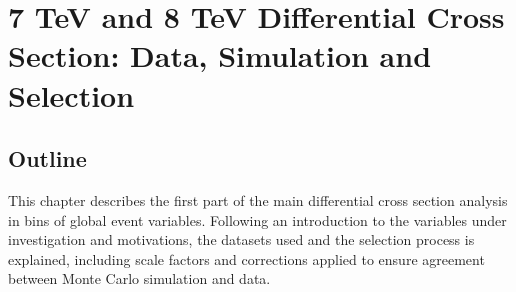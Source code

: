 \chapter{7 TeV and 8 TeV Differential Cross Section: Data, Simulation and Selection}
\label{c:Differential_Cross_Section:data_simulation_and_selection}

\section{Outline}
\label{s:analysis1_outline}
This chapter describes the first part of the main \ttbar differential cross section analysis in bins of
global event variables. Following an introduction to the variables under investigation and motivations, the
datasets used and the selection process is explained, including scale factors and corrections applied to ensure agreement between Monte Carlo
simulation and data.

